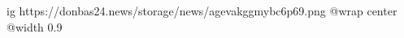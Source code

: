  
 
 
 
 

\ifcmt
  ig https://donbas24.news/storage/news/agevakggmybc6p69.png
  @wrap center
  @width 0.9
\fi
